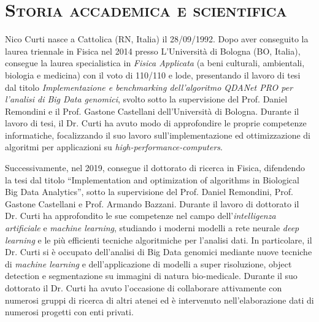 \documentclass[a4paper,11pt]{article}
\newcommand{\quotes}[1]{``#1''}
\begin{document}
\maketitle

\section*{\scshape{Storia accademica e scientifica}}

Nico Curti nasce a Cattolica (RN, Italia) il 28/09/1992.
Dopo aver conseguito la laurea triennale in Fisica nel 2014 presso L'Università di Bologna (BO, Italia), consegue la laurea specialistica in \emph{Fisica Applicata} (a beni culturali, ambientali, biologia e medicina) con il voto di 110/110 e lode, presentando il lavoro di tesi dal titolo \emph{Implementazione e benchmarking dell'algoritmo QDANet PRO per l'analisi di Big Data genomici}, svolto sotto la supervisione del Prof. Daniel Remondini e il Prof. Gastone Castellani dell'Università di Bologna.
Durante il lavoro di tesi, il Dr. Curti ha avuto modo di approfondire le proprie competenze informatiche, focalizzando il suo lavoro sull'implementazione ed ottimizzazione di algoritmi per applicazioni su \emph{high-performance-computers}.

Successivamente, nel 2019, consegue il dottorato di ricerca in Fisica, difendendo la tesi dal titolo \quotes{Implementation and optimization of algorithms in Biological Big Data Analytics}, sotto la supervisione del Prof. Daniel Remondini, Prof. Gastone Castellani e Prof. Armando Bazzani.
Durante il lavoro di dottorato il Dr. Curti ha approfondito le sue competenze nel campo dell'\emph{intelligenza artificiale} e \emph{machine learning}, studiando i moderni modelli a rete neurale \emph{deep learning} e le più efficienti tecniche algoritmiche per l'analisi dati.
In particolare, il Dr. Curti si è occupato dell'analisi di Big Data genomici mediante nuove tecniche di \emph{machine learning} e dell'applicazione di modelli a super risoluzione, object detection e segmentazione su immagini di natura bio-medicale.
Durante il suo dottorato il Dr. Curti ha avuto l'occasione di collaborare attivamente con numerosi gruppi di ricerca di altri atenei ed è intervenuto nell'elaborazione dati di numerosi progetti con enti privati.
\end{document}
